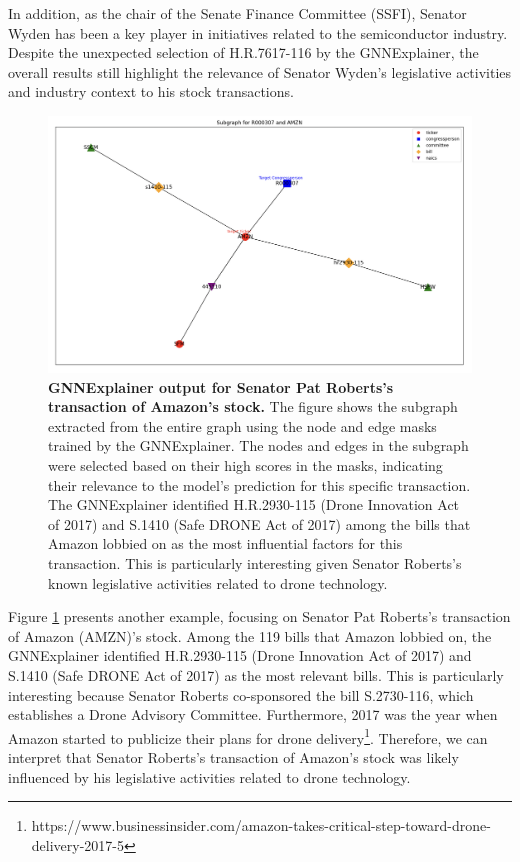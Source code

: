 \documentclass[15pt,letterpaper]{article}
\begin{document}
In addition, as the chair of the Senate Finance Committee (SSFI), Senator Wyden has been a key player in initiatives related to the semiconductor industry. Despite the unexpected selection of H.R.7617-116 by the GNNExplainer, the overall results still highlight the relevance of Senator Wyden's legislative activities and industry context to his stock transactions.

\begin{figure}[h!]
  \centering
  \includegraphics[width=1.1\textwidth, height=0.4\textheight]{imgs/gnnex-rob-pat.png}
  \caption{\textbf{GNNExplainer output for Senator Pat Roberts's transaction of Amazon's stock.} The figure shows the subgraph extracted from the entire graph using the node and edge masks trained by the GNNExplainer. The nodes and edges in the subgraph were selected based on their high scores in the masks, indicating their relevance to the model's prediction for this specific transaction. The GNNExplainer identified H.R.2930-115 (Drone Innovation Act of 2017) and S.1410 (Safe DRONE Act of 2017) among the bills that Amazon lobbied on as the most influential factors for this transaction. This is particularly interesting given Senator Roberts's known legislative activities related to drone technology.}
  \label{fig:pat-gnnex}
\end{figure}

Figure \ref{fig:pat-gnnex} presents another example, focusing on Senator Pat Roberts's transaction of Amazon (AMZN)'s stock. Among the 119 bills that Amazon lobbied on, the GNNExplainer identified H.R.2930-115 (Drone Innovation Act of 2017) and S.1410 (Safe DRONE Act of 2017) as the most relevant bills. This is particularly interesting because Senator Roberts co-sponsored the bill S.2730-116, which establishes a Drone Advisory Committee. Furthermore, 2017 was the year when Amazon started to publicize their plans for drone delivery\footnote{https://www.businessinsider.com/amazon-takes-critical-step-toward-drone-delivery-2017-5}. 
Therefore, we can interpret that Senator Roberts's transaction of Amazon's stock was likely influenced by his legislative activities related to drone technology.
\end{document}
